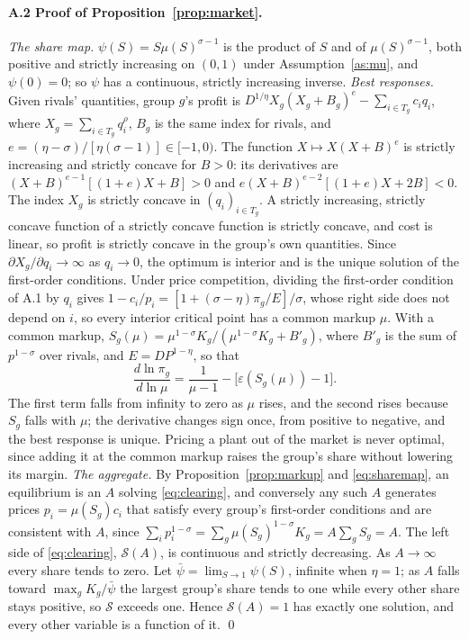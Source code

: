 \documentclass[11pt]{article}
\theoremstyle{definition}
\theoremstyle{remark}
\begin{document}
\paragraph{A.2 Proof of Proposition~\ref{prop:market}.} \emph{The share map.}
$\psi(S)=S\mu(S)^{\sigma-1}$ is the product of $S$ and of $\mu(S)^{\sigma-1}$, both
positive and strictly increasing on $(0,1)$ under Assumption~\ref{as:mu}, and
$\psi(0)=0$; so $\psi$ has a continuous, strictly increasing inverse.
\emph{Best responses.} Given rivals' quantities, group $g$'s profit is
$D^{1/\eta}X_g(X_g+B_g)^{e}-\sum_{i\in T_g}c_iq_i$, where $X_g=\sum_{i\in T_g}q_i^\rho$,
$B_g$ is the same index for rivals, and $e=(\eta-\sigma)/[\eta(\sigma-1)]\in[-1,0)$. The
function $X\mapsto X(X+B)^e$ is strictly increasing and strictly concave for $B>0$: its
derivatives are $(X+B)^{e-1}[(1+e)X+B]>0$ and $e(X+B)^{e-2}[(1+e)X+2B]<0$. The index
$X_g$ is strictly concave in $(q_i)_{i\in T_g}$. A strictly increasing, strictly
concave function of a strictly concave function is strictly concave, and cost is
linear, so profit is strictly concave in the group's own quantities. Since
$\partial X_g/\partial q_i\to\infty$ as $q_i\to0$, the optimum is interior and is the
unique solution of the first-order conditions. Under price competition, dividing the first-order condition of
A.1 by $q_i$ gives $1-c_i/p_i=[1+(\sigma-\eta)\pi_g/E]/\sigma$, whose right side does
not depend on $i$, so every interior critical point has a common markup $\mu$. With a
common markup, $S_g(\mu)=\mu^{1-\sigma}K_g/(\mu^{1-\sigma}K_g+B'_g)$, where $B'_g$ is the
sum of $p^{1-\sigma}$ over rivals, and $E=DP^{1-\eta}$, so that
\[
  \frac{d\ln\pi_g}{d\ln\mu}=\frac{1}{\mu-1}-\bigl[\varepsilon(S_g(\mu))-1\bigr].
\]
The first term falls from infinity to zero as $\mu$ rises, and the second rises because
$S_g$ falls with $\mu$; the derivative changes sign once, from positive to negative, and
the best response is unique. Pricing a plant out of the market is never optimal, since
adding it at the common markup raises the group's share without lowering its margin. \emph{The aggregate.} By
Proposition~\ref{prop:markup} and \eqref{eq:sharemap}, an equilibrium is an $A$ solving
\eqref{eq:clearing}, and conversely any such $A$ generates prices
$p_i=\mu(S_g)c_i$ that satisfy every group's first-order conditions and are consistent
with $A$, since $\sum_ip_i^{1-\sigma}=\sum_g\mu(S_g)^{1-\sigma}K_g=A\sum_gS_g=A$. The
left side of \eqref{eq:clearing}, $\mathcal S(A)$, is continuous and strictly decreasing.
As $A\to\infty$ every share tends to zero. Let $\bar\psi=\lim_{S\to1}\psi(S)$, infinite
when $\eta=1$; as $A$ falls toward $\max_gK_g/\bar\psi$ the largest group's share tends
to one while every other share stays positive, so $\mathcal S$ exceeds one. Hence
$\mathcal S(A)=1$ has exactly one solution, and every other variable is a function of it.
\qed
\end{document}
